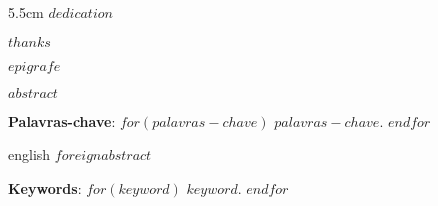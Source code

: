 \documentclass[
	12pt,				%
	oneside,			%
	a4paper,			%
	chapter=TITLE,		%
	section=TITLE,		%
	english,			%
	brazil				%
	]{abntex2}
\begin{document}
\begin{dedicatoria}
	\vspace*{\fill}
	\noindent
	\begin{adjustwidth*}{}{5.5cm}
		\raggedleft
		$dedication$
	\end{adjustwidth*}
\end{dedicatoria}

\begin{agradecimentos}
	$thanks$
\end{agradecimentos}

\begin{epigrafe}
	\vspace*{\fill}
	\begin{flushright}
		\textit{$epigrafe$}
	\end{flushright}
\end{epigrafe}


\setlength{\absparsep}{18pt} %
\begin{resumo}
	\SingleSpacing
  $abstract$

  \textbf{Palavras-chave}:
  $for(palavras-chave)$
  $palavras-chave$.
  $endfor$
\end{resumo}

\begin{resumo}[Abstract]
	\SingleSpacing
	\begin{otherlanguage*}{english}
		$foreignabstract$

		\textbf{Keywords}:
	  $for(keyword)$
    $keyword$.
    $endfor$
	\end{otherlanguage*}
\end{resumo}

%
%
%
\end{document}
